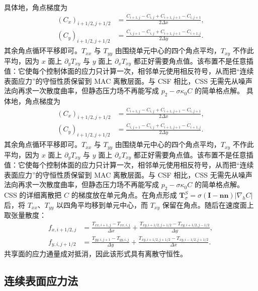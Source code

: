 \documentclass[11pt,a4paper,openany,fontset=none]{ctexbook}
\begin{document}
具体地，角点梯度为
\begin{align}
(C_x)_{i+1/2,j+1/2}&=\frac{C_{i+1,j}-C_{i,j}+C_{i+1,j+1}-C_{i,j+1}}{2\Delta x},\\
(C_y)_{i+1/2,j+1/2}&=\frac{C_{i,j+1}-C_{i,j}+C_{i+1,j+1}-C_{i+1,j}}{2\Delta y}.
\tag{7.27--7.28}
\end{align}
其余角点循环平移即可。$T_{xx}$ 与 $T_{yy}$ 由围绕单元中心的四个角点平均，$T_{xy}$ 不作此平均，因为 $x$ 面上 $\partial_yT_{xy}$ 与 $y$ 面上 $\partial_xT_{xy}$ 都正好需要角点值。该布置不是任意插值：它使每个控制体面的应力只计算一次，相邻单元使用相反符号，从而把“连续表面应力”的守恒性质保留到 MAC 离散层面。与 CSF 相比，CSS 无需先从噪声法向再求一次散度曲率，但静态压力场不再能写成 $p_2-\sigma\kappa_0C$ 的简单格点解。
具体地，角点梯度为
\begin{align}
(C_x)_{i+1/2,j+1/2}&=\frac{C_{i+1,j}-C_{i,j}+C_{i+1,j+1}-C_{i,j+1}}{2\Delta x},\\
(C_y)_{i+1/2,j+1/2}&=\frac{C_{i,j+1}-C_{i,j}+C_{i+1,j+1}-C_{i+1,j}}{2\Delta y}.
\tag{7.27--7.28}
\end{align}
其余角点循环平移即可。$T_{xx}$ 与 $T_{yy}$ 由围绕单元中心的四个角点平均，$T_{xy}$ 不作此平均，因为 $x$ 面上 $\partial_yT_{xy}$ 与 $y$ 面上 $\partial_xT_{xy}$ 都正好需要角点值。该布置不是任意插值：它使每个控制体面的应力只计算一次，相邻单元使用相反符号，从而把“连续表面应力”的守恒性质保留到 MAC 离散层面。与 CSF 相比，CSS 无需先从噪声法向再求一次散度曲率，但静态压力场不再能写成 $p_2-\sigma\kappa_0C$ 的简单格点解。
CSS 的详细离散把 $C$ 的梯度放在单元角点。在角点形成 $\boldsymbol T^S_\sigma=\sigma(\boldsymbol I-\boldsymbol n\boldsymbol n)|\nabla_hC|$ 后，将 $T_{xx}$、$T_{yy}$ 以四角平均移到单元中心，而 $T_{xy}$ 保留在角点。随后在速度面上取张量散度：
\begin{align}
f_{x,i+1/2,j}&=\frac{T_{xx,i+1,j}-T_{xx,i,j}}{\Delta x}
+\frac{T_{xy,i+1/2,j+1/2}-T_{xy,i+1/2,j-1/2}}{\Delta y},\\
f_{y,i,j+1/2}&=\frac{T_{yy,i,j+1}-T_{yy,i,j}}{\Delta y}
+\frac{T_{xy,i+1/2,j+1/2}-T_{xy,i-1/2,j+1/2}}{\Delta x}.
\tag{7.32--7.33}
\end{align}
共享面的应力通量成对抵消，因此该形式具有离散守恒性。
\subsection{连续表面应力法}
\end{document}

